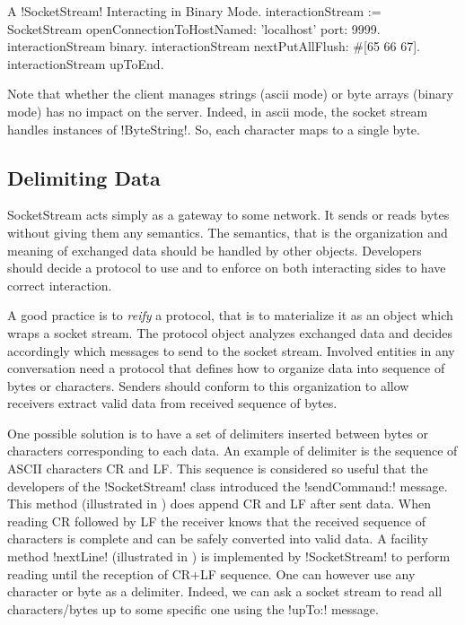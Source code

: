 \documentclass[a4paper,10pt,twoside]{book}
\begin{document}
\begin{script}{A \ct!SocketStream! Interacting in Binary Mode.}
interactionStream := SocketStream 
									openConnectionToHostNamed: 'localhost' port: 9999.  
interactionStream binary.
interactionStream nextPutAllFlush: #[65 66 67].
interactionStream upToEnd.
\end{script}

Note that whether the client manages strings (ascii mode) or byte arrays (binary mode) has no impact on the server.
Indeed, in ascii mode, the socket stream handles instances of \ct!ByteString!.
So, each character maps to a single byte. 

\subsection{Delimiting Data}
SocketStream acts simply as a gateway to some network. 
It sends or reads bytes without giving them any semantics.
The semantics, that is the organization and meaning of exchanged data should be handled by other objects.
Developers should decide a protocol to use and to enforce on both interacting sides to have correct interaction.

A good practice is to \emph{reify} a protocol, that is to materialize it as an object which wraps a socket stream. 
The protocol object analyzes exchanged data and decides accordingly which messages to send to the socket stream.
Involved entities in any conversation need a protocol that defines how to organize data into sequence of bytes or characters.
Senders should conform to this organization to allow receivers extract valid data from received sequence of bytes.
 
One possible solution is to have a set of delimiters inserted between bytes or characters corresponding to each data.
An example of delimiter is the sequence of ASCII characters CR and LF.
This sequence is considered so useful that the developers of the \ct!SocketStream! class introduced the \ct!sendCommand:! message.
This method (illustrated in ) does append CR and LF after sent data.
When reading CR followed by LF the receiver knows that the received sequence of characters is complete and can be safely converted into valid data.
A facility method \ct!nextLine! (illustrated in ) is implemented by \ct!SocketStream! to perform reading until the reception of CR+LF sequence.
One can however use any character or byte as a delimiter.
Indeed, we can ask a socket stream to read all characters/bytes up to some specific one using the \ct!upTo:! message.
\end{document}
